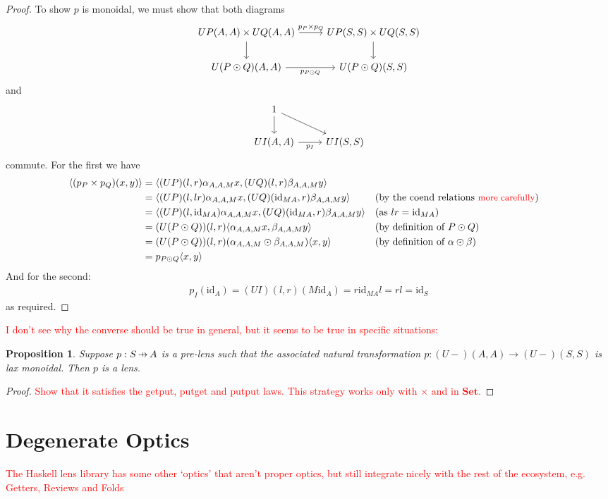 \documentclass[11pt,a4paper]{article}
\theoremstyle{plain}
\newtheorem{proposition}[theorem]{Proposition}
\theoremstyle{definition}
\newcommand{\Set}{\mathbf{Set}}
\newcommand{\id}{\mathrm{id}}
\newcommand{\hto}{\ensuremath{\,\mathaccent\shortmid\rightarrow\,}}
\newcommand{\todo}[1]{\textcolor{red}{\small #1}}
\begin{document}
\begin{proof}
To show $p$ is monoidal, we must show that both diagrams
\[
\begin{tikzcd}
UP(A,A) \times UQ(A,A) \ar[r, "p_P \times p_Q"] \ar[d, swap] & UP(S, S) \times UQ(S, S)  \ar[d] \\
U(P \odot Q)(A,A)  \ar[r, "p_{P \odot Q}", swap] & U(P \odot Q)(S,S)
\end{tikzcd}
\]
and
\[
\begin{tikzcd}
1 \ar[d] \ar[dr] & \\
UI(A,A)  \ar[r, "p_I", swap] & UI(S,S)
\end{tikzcd}
\]
commute. For the first we have
\begin{align*}
\langle (p_P \times p_Q)(x, y) \rangle &= \langle (UP)(l,r) \alpha_{A,A,M} x,  (UQ)(l,r) \beta_{A,A,M} y\rangle \\
&= \langle (UP)(l,lr) \alpha_{A,A,M} x, (UQ)(\id_{MA},r) \beta_{A,A,M} y\rangle && \text{(by the coend relations \todo{more carefully})} \\
&= \langle (UP)(l,\id_{MA}) \alpha_{A,A,M} x, (UQ)(\id_{MA},r) \beta_{A,A,M} y\rangle && \text{(as $lr = \id_{MA}$)} \\
&= (U(P \odot Q))(l,r) \langle \alpha_{A,A,M} x, \beta_{A,A,M} y \rangle && \text{(by definition of $P \odot Q$)} \\
&= (U(P \odot Q))(l,r) (\alpha_{A,A,M} \odot \beta_{A,A,M}) \langle x, y \rangle && \text{(by definition of $\alpha \odot \beta$)} \\
&= p_{P \odot Q} \langle x, y \rangle
\end{align*}
And for the second:
\begin{align*}
p_I(\id_A) = (UI)(l,r) (M \id_A) = r \id_{MA} l = rl = \id_S
\end{align*}
as required.
\end{proof}

\todo{I don't see why the converse should be true in general, but it seems to be true in specific situations:}

\begin{proposition}
Suppose $p : S \hto A$ is a pre-lens such that the associated natural transformation $p : (U-)(A,A) \to (U-)(S,S)$ is lax monoidal. Then $p$ is a lens.
\end{proposition}
\begin{proof}
\todo{Show that it satisfies the getput, putget and putput laws. This strategy works only with $\times$ and in $\Set$.}
\end{proof}

\section{Degenerate Optics}
\todo{The Haskell lens library has some other `optics' that aren't proper optics, but still integrate nicely with the rest of the ecosystem, e.g. Getters, Reviews and Folds}
\end{document}

